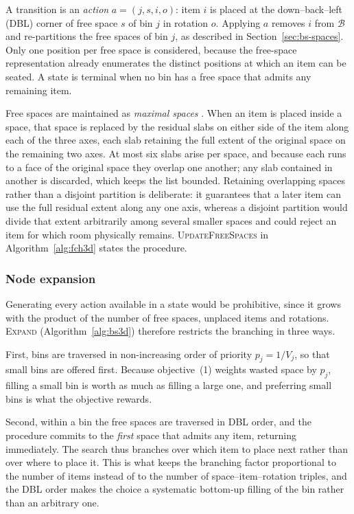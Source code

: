 A transition is an \emph{action} $a = (j,s,i,o)$: item $i$ is placed at the
down--back--left (DBL) corner of free space $s$ of bin $j$ in rotation $o$.
Applying $a$ removes $i$ from $\mathcal{B}$ and re-partitions the free spaces
of bin $j$, as described in Section~\ref{sec:bs-spaces}. Only one position per
free space is considered, because the free-space representation already
enumerates the distinct positions at which an item can be seated. A state is
terminal when no bin has a free space that admits any remaining item.

Free spaces are maintained as \emph{maximal spaces} \citep{parreno2008}. When
an item is placed inside a space, that space is replaced by the residual slabs
on either side of the item along each of the three axes, each slab retaining
the full extent of the original space on the remaining two axes. At most six
slabs arise per space, and because each runs to a face of the original space
they overlap one another; any slab contained in another is discarded, which
keeps the list bounded. Retaining overlapping spaces rather than a disjoint
partition is deliberate: it guarantees that a later item can use the full
residual extent along any one axis, whereas a disjoint partition would divide
that extent arbitrarily among several smaller spaces and could reject an item
for which room physically remains. \textsc{UpdateFreeSpaces} in
Algorithm~\ref{alg:fch3d} states the procedure.
\label{sec:bs-spaces}

\subsubsection{Node expansion}

Generating every action available in a state would be prohibitive, since it
grows with the product of the number of free spaces, unplaced items and
rotations. \textsc{Expand} (Algorithm~\ref{alg:bs3d}) therefore restricts the
branching in three ways.

First, bins are traversed in non-increasing order of priority $p_j = 1/V_j$,
so that small bins are offered first. Because objective~(1) weights wasted
space by $p_j$, filling a small bin is worth as much as filling a large one,
and preferring small bins is what the objective rewards.

Second, within a bin the free spaces are traversed in DBL order, and the
procedure commits to the \emph{first} space that admits any item, returning
immediately. The search thus branches over which item to place next rather
than over where to place it. This is what keeps the branching factor
proportional to the number of items instead of to the number of
space--item--rotation triples, and the DBL order makes the choice a systematic
bottom-up filling of the bin rather than an arbitrary one.

